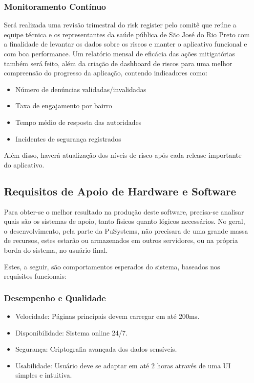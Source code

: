\documentclass[a4paper, 12pt]{article}
\begin{document}
\subsubsection{Monitoramento Contínuo}
    Será realizada uma revisão trimestral do risk register pelo comitê que reúne a equipe técnica e os representantes da saúde pública de São José do Rio Preto com a finalidade de levantar os dados sobre os riscos e manter o aplicativo funcional e com boa performance. 
    Um relatório mensal de eficácia das ações mitigatórias também será feito, além da criação de dashboard de riscos para uma melhor compreensão do progresso da aplicação, contendo indicadores como: 
    \begin{itemize}
        \item Número de denúncias validadas/invalidadas
        \item Taxa de engajamento por bairro
        \item Tempo médio de resposta das autoridades
        \item Incidentes de segurança registrados
    \end{itemize}
    Além disso, haverá atualização dos níveis de risco após cada release importante do aplicativo.



\subsection{Requisitos de Apoio de Hardware e Software}

Para obter-se o melhor resultado na produção deste software, precisa-se analisar quais são os sistemas de apoio, tanto físicos quanto lógicos necessários. No geral, o desenvolvimento, pela parte da PuSystems, não precisara de uma grande massa de recursos, estes estarão ou armazenados em outros servidores, ou na própria borda do sistema, no usuário final. 

Estes, a seguir, são comportamentos esperados do sistema, baseados nos requisitos funcionais: 

\subsubsection{Desempenho e Qualidade}
\begin{itemize}[]
  \item Velocidade: Páginas principais devem carregar em até 200ms.
  \item Disponibilidade: Sistema online 24/7.
  \item Segurança: Criptografia avançada dos dados sensíveis.
  \item Usabilidade: Usuário deve se adaptar em até 2 horas através de uma UI simples e intuitiva.
\end{itemize}
\end{document}
